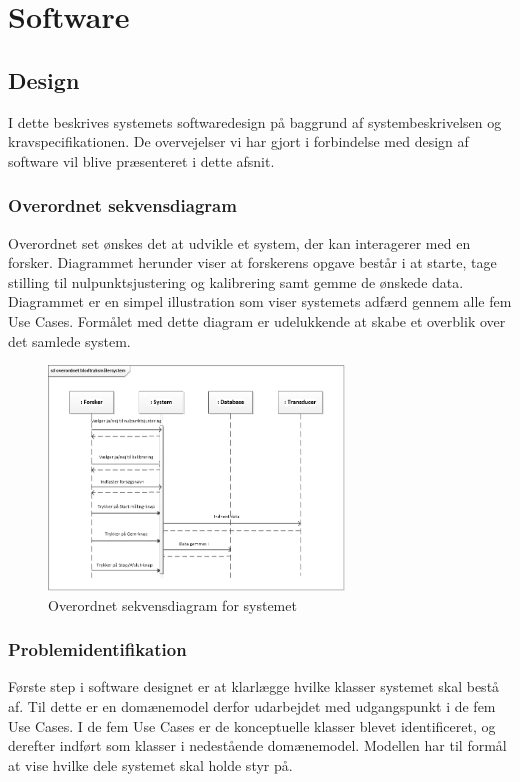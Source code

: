 \section{Software}
\subsection{Design}
I dette beskrives systemets softwaredesign på baggrund af systembeskrivelsen og kravspecifikationen. De overvejelser vi har gjort i forbindelse med design af software vil blive præsenteret i dette afsnit. 

\subsubsection{Overordnet sekvensdiagram}
Overordnet set ønskes det at udvikle et system, der kan interagerer med en forsker. Diagrammet herunder viser at forskerens opgave består i at starte, tage stilling til nulpunktsjustering og kalibrering samt gemme de ønskede data. Diagrammet er en simpel illustration som viser systemets adfærd gennem alle fem Use Cases. Formålet med dette diagram er udelukkende at skabe et overblik over det samlede system.

\begin{figure}[H]
	\centering
	\includegraphics[width=0.7\textwidth]{Figurer/OverordnetSD}
	\caption{Overordnet sekvensdiagram for systemet}
\end{figure}

\subsubsection{Problemidentifikation}
Første step i software designet er at klarlægge hvilke klasser systemet skal bestå af. Til dette er en domænemodel derfor udarbejdet med udgangspunkt i de fem Use Cases. I de fem Use Cases er de konceptuelle klasser blevet identificeret, og derefter indført som klasser i nedestående domænemodel. Modellen har til formål at vise hvilke dele systemet skal holde styr på. 

